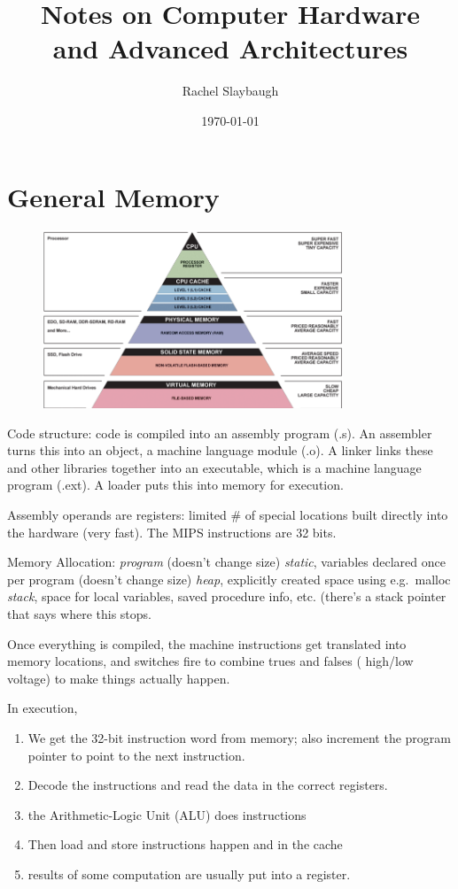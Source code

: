 \documentclass[12pt,twoside]{article}
\date{\today}
\title{Notes on Computer Hardware \\and Advanced Architectures}
\author{Rachel Slaybaugh}
\begin{document}
\maketitle

\section*{General Memory}

\begin{figure}[!ht]
\begin{center}
  \includegraphics[width=0.8\textwidth, height=0.45\textheight]{cpu-memory-hierarchy}
  \label{fig:cpu-memory}
\end{center}
\end{figure}

Code structure: code is compiled into an assembly program (.s). An assembler turns this into an object, a machine language module (.o). A linker links these and other libraries together into an executable, which is a machine language program (.ext). A loader puts this into memory for execution.

Assembly operands are registers: limited \# of special locations built directly into the hardware (very fast). The MIPS instructions are 32 bits. 

Memory Allocation: \textit{program} (doesn't change size) \rightarrow \textit{static}, variables declared once per program (doesn't change size) \rightarrow \textit{heap}, explicitly created space using e.g.\ malloc \rightarrow \textit{stack}, space for local variables, saved procedure info, etc. (there's a stack pointer that says where this stops.

Once everything is compiled, the machine instructions get translated into memory locations, and switches fire to combine trues and falses (
high/low voltage) to make things actually happen.

In execution, 
\begin{enumerate}
  \item We get the 32-bit instruction word from memory; also increment the program pointer to point to the next instruction. 
  \item Decode the instructions and read the data in the correct registers.  
  \item the Arithmetic-Logic Unit (ALU) does instructions
  \item Then load and store instructions happen and in the cache
  \item results of some computation are usually put into a register.
\end{enumerate}
\end{document}

